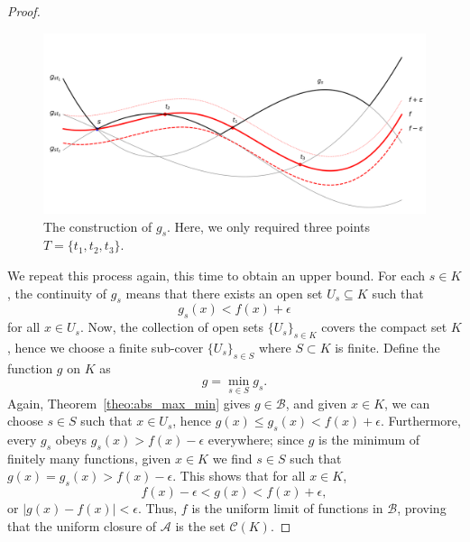 \documentclass[11pt]{article}
\theoremstyle{definition}
\theoremstyle{remark}
\begin{document}
\begin{proof}
        \begin{figure}[ht]
            \centering
            \includegraphics[width=1.0\textwidth]{./img/weierstrass_A_4.png}
            \caption{The construction of $g_s$. Here, we only required three points
            $T = \{t_1, t_2, t_3\}$.}
            \label{fig:weierstrass_A}
        \end{figure}

        We repeat this process again, this time to obtain an upper bound. For each $s
        \in K$, the continuity of $g_s$ means that there exists an open set $U_s
        \subseteq K$ such that \[
            g_s(x) < f(x) + \epsilon
        \] for all $x \in U_s$. Now, the collection of open sets $\{U_s\}_{s \in K}$
        covers the compact set $K$, hence we choose a finite sub-cover $\{U_s\}_{s
        \in S}$ where $S \subset K$ is finite. Define the function $g$ on $K$ as \[
            g = \min_{s \in S} g_s.
        \] Again, Theorem~\ref{theo:abs_max_min} gives $g \in \mathscr{B}$, and given
        $x \in K$, we can choose $s \in S$ such that $x \in U_s$, hence $g(x) \leq
        g_s(x) < f(x) + \epsilon$. Furthermore, every $g_s$ obeys $g_s(x) > f(x) -
        \epsilon$ everywhere; since $g$ is the minimum of finitely many functions,
        given $x \in K$ we find $s \in S$ such that $g(x) = g_s(x) > f(x) -
        \epsilon$. This shows that for all $x \in K$, \[
            f(x) - \epsilon < g(x) < f(x) + \epsilon,
        \] or $|g(x) - f(x)| < \epsilon$. Thus, $f$ is the uniform limit of functions
        in $\mathscr{B}$, proving that the uniform closure of $\mathscr{A}$ is the
        set $\mathscr{C}(K)$. \qedhere
        

\end{proof}
\end{document}
